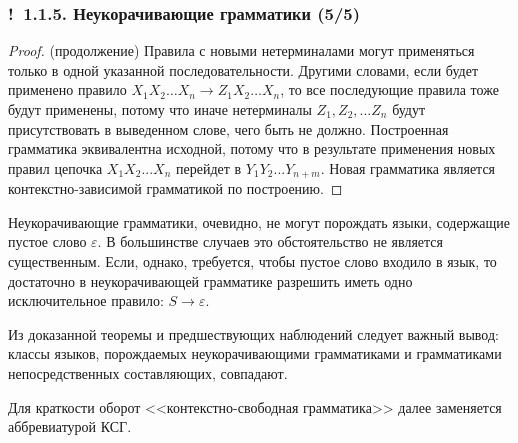 \documentclass[mathserif,12pt,aspectratio=169]{beamer}
\def\Ok{{\color{green}\textbf{!}\ }}
\begin{document}
\begin{frame}
\frametitle{\Ok 1.1.5. Неукорачивающие грамматики (5/5)}
\begin{proof} (продолжение)
Правила с новыми нетерминалами могут применяться только в одной указанной последовательности. 
Другими словами, если будет применено правило 
$X_1 X_2 \dots X_n \rightarrow Z_1 X_2 \dots X_n$, то все последующие правила тоже будут применены, потому что иначе нетерминалы $Z_1, Z_2, ... Z_n$ будут присутствовать в выведенном слове, чего быть не должно.
Построенная грамматика эквивалентна исходной, потому что в результате применения новых правил 
цепочка $X_1 X_2 ... X_n$ перейдет в $Y_1 Y_2 ... Y_{n+m}$. 
Новая грамматика является контекстно-зависимой грамматикой по построению.
\end{proof}

\begin{remark}
Неукорачивающие грамматики,
очевидно, не могут порождать
языки, содержащие пустое слово $\varepsilon$.
В большинстве случаев это обстоятельство
не является существенным.
Если, однако, требуется,
чтобы пустое слово входило
в язык, то достаточно
в неукорачивающей 
грамматике разрешить иметь
одно исключительное правило:
$S\to\varepsilon$. 
\end{remark}


\medskip
Из доказанной теоремы и предшествующих наблюдений
следует важный вывод:
классы языков, порождаемых неукорачивающими грамматиками и грамматиками непосредственных составляющих, совпадают. 


\begin{remark}
Для краткости оборот <<контекстно-свободная грамматика>> далее заменяется аббревиатурой КСГ. 
\end{remark}
\end{frame}
\end{document}
